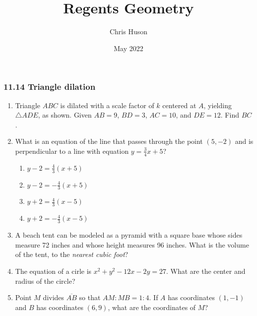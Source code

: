 \documentclass[12pt, oneside]{article}
\title{Regents Geometry}
\author{Chris Huson}
\date{May 2022}
\begin{document}
\subsubsection*{11.14 Triangle dilation}
\begin{enumerate}[itemsep=1.2cm]
    \item Triangle $ABC$ is dilated with a scale factor of $k$ centered at $A$, yielding $\triangle ADE$, as shown. Given $AB=9$, $BD=3$, $AC=10$, and $DE=12$. Find $BC$.
    \begin{center}
    \end{center}

\item What is an equation of the line that passes through the point $(5,-2)$ and is perpendicular to a line with equation $y=\frac{3}{4}x+5$?
    \begin{multicols}{2}
    \begin{enumerate}
        \item $y-2=\frac{4}{3}(x+5)$
        \item $y-2=-\frac{4}{3}(x+5)$ 
        \item $y+2=\frac{4}{3}(x-5)$
        \item $y+2=-\frac{4}{3}(x-5)$
    \end{enumerate}
    \end{multicols}

\item A beach tent can be modeled as a pyramid with a square base whose sides measure 72 inches and whose height measures 96 inches. What is the volume of the tent, to the \emph{nearest cubic foot}?

\item The equation of a cirle is $x^2+y^2-12x-2y=27$. What are the center and radius of the circle?

\item Point $M$ divides $\overline{AB}$ so that $AM:MB = 1:4$. If $A$ has coordinates $(1,-1)$ and $B$ has coordinates $(6,9)$, what are the coordinates of $M$?


\end{enumerate}
\end{document}
